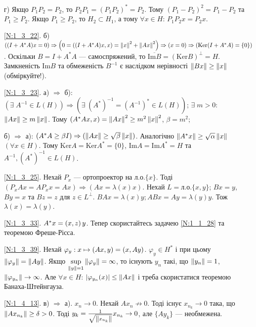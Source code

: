 \noindent г) Якщо $P_1 P_2 = P_2$, то $P_2 P_1 = (P_1 P_2)^* = P_2$. Тому
$(P_1 - P_2)^2 = P_1 - P_2$ та $P_1 \geq P_2$. Якщо $P_1 \geq P_2$, то $H_2 \subset H_1$,
а тому $\forall x \in H$: $P_1 P_2 x = P_2 x$.

\noindent\ref{N:1_3_22}. б) $((I + A^* A)x = 0) \Rightarrow \left(0 = \left((I + A^* A)x, x\right)
= \left\lVert x\right\rVert^2 + \left\lVert Ax\right\rVert^2\right) \Rightarrow (x=0) \Rightarrow (\mathrm{Ker}(I + A^* A) = \{0\})$.
Оскільки $B = I + A^* A$ --- самоспряжений, то $\overline{\mathrm{Im}B} =
(\mathrm{Ker}B)^\perp = H$. Замкненість $\mathrm{Im}B$ та обмеженість $B^{-1}$ є наслідком
нерівності $\left\lVert Bx\right\rVert \geq \left\lVert x\right\rVert$ (обміркуйте!). 

\noindent\ref{N:1_3_23}. а) $\Rightarrow$ б): $\left(\exists \;A^{-1} \in L(H)\right) \Rightarrow
\left(\exists\;(A^*)^{-1} = (A^{-1})^* \in L(H)\right)$;
$\exists \;m>0$: $\left\lVert Ax\right\rVert \geq m\left\lVert x\right\rVert$. Тому $\left(A^* A x, x\right) = \left\lVert Ax\right\rVert^2 \geq
m^2 \left\lVert x\right\rVert^2$, $\beta = m^2$;

\noindent б) $\Rightarrow$ а): $(A^* A \geq \beta I) \Rightarrow (\left\lVert Ax\right\rVert \geq 
\sqrt{\beta}\left\lVert x\right\rVert)$. Аналогічно $\left\lVert A^* x\right\rVert \geq \sqrt{\alpha}\left\lVert x\right\rVert$ $(\forall x \in H)$.
Тому $\mathrm{Ker}A = \mathrm{Ker}A^* = \{0\}$, $\mathrm{Im}A = \mathrm{Im}A^* = H$ та
$A^{-1}, (A^*)^{-1} \in L(H)$.

\noindent\ref{N:1_3_25}. Нехай $P_x$ --- ортопроектор на л.о.$\{x\}$. Тоді $(P_x Ax = 
AP_x x = Ax) \Rightarrow (Ax = \lambda(x)x)$. Нехай $L = \text{л.о.}\{x,y\}$;
$Bx = y$, $By = x$ та $Bz = z$ для $z \in L^\perp$. $BAx = \lambda(x)y; ABx = Ay = \lambda(y)y$.
Тож $\lambda(x) = \lambda(y)$.

\noindent\ref{N:1_3_33}. $A^* x = \left(x, z\right)y$. Тепер скористайтесь задачею \ref{N:1_1_28}
та теоремою Фреше-Рісса.

\noindent\ref{N:1_3_39}. Нехай $\varphi_y: x \mapsto \left(Ax, y\right) = \left(x, Ay\right)$.
$\varphi_y \in H^*$ і при цьому $\left\lVert\varphi_y\right\rVert = \left\lVert Ay\right\rVert$. Якщо 
$\underset{\left\lVert y\right\rVert=1}{\sup} \left\lVert\varphi_y\right\rVert = \infty$, то існують $y_n$ такі,
що $\left\lVert y_n\right\rVert = 1$, $\left\lVert\varphi_{y_n}\right\rVert \to \infty$.
Але $\forall x \in H$: $|\varphi_{y_n}(x)| \leq \left\lVert Ax\right\rVert$ і треба скористатися теоремою Банаха-Штейнгауза.

\noindent\ref{N:1_4_13}. в) $\Rightarrow$ а). $x_n \rightarrow 0$. Нехай $A x_n \not\rightarrow 0$. Тоді існує
$x_{n_k} \rightarrow 0$ така, що $\left\lVert A x_{n_k}\right\rVert \geq \delta > 0$. Тоді 
$y_k = \frac{1}{\sqrt{\left\lVert x_{n_k}\right\rVert}} x_{n_k} \rightarrow 0$, але $\{A y_k\}$ --- необмежена.

